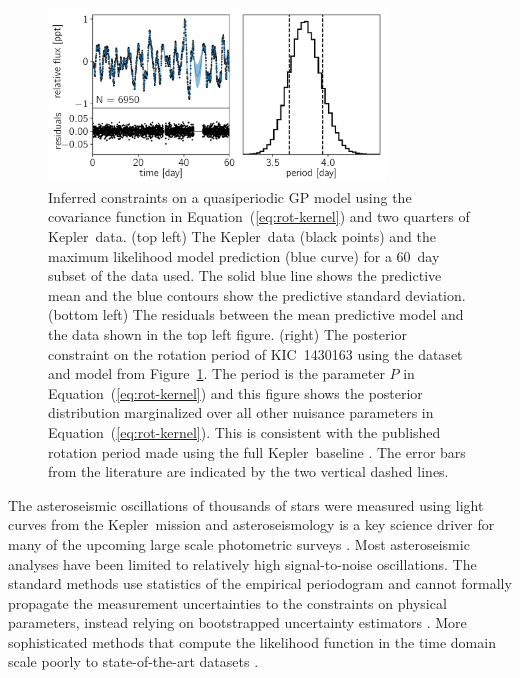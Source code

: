 \documentclass[manuscript, letterpaper]{aastex6}
\makeatletter
\let\origsubsection\subsection
\renewcommand\subsection{\@ifstar{\starsubsection}{\nostarsubsection}}
\newcommand\nostarsubsection[1]{\subsectionprelude\origsubsection{#1}}
\newcommand\starsubsection[1]{\subsectionprelude\origsubsection*{#1}}
\newcommand\subsectionprelude{\vspace{1em}}
\newcommand{\project}[1]{\textsf{#1}}
\newcommand{\kepler}{\project{Kepler}}
\newcommand{\figureref}[1]{\ref{fig:#1}}
\newcommand{\Figure}[1]{Figure~\figureref{#1}}
\newcommand{\figurelabel}[1]{\label{fig:#1}}
\renewcommand{\eqref}[1]{\ref{eq:#1}}
\newcommand{\Eq}[1]{Equation~(\eqref{#1})}
\newcommand{\eq}[1]{\Eq{#1}}
\makeatother
\begin{document}


\begin{figure}[p]
\begin{center}
\includegraphics[width=0.8\textwidth]{figures/rotation/rotation.pdf}
\caption{Inferred constraints on a quasiperiodic GP model using the covariance
    function in \eq{rot-kernel} and two quarters of \kepler\ data.
(top left) The \kepler\ data (black points) and the maximum likelihood model
    prediction (blue curve) for a 60~day subset of the data used.
    The solid blue line shows the predictive mean and the blue contours show
    the predictive standard deviation.
(bottom left) The residuals between the mean predictive model and the data
    shown in the top left figure.
(right) The posterior constraint on the rotation period of KIC~1430163 using
    the dataset and model from \Figure{rotation}.
    The period is the parameter $P$ in \eq{rot-kernel} and this figure shows
    the posterior distribution marginalized over all other nuisance parameters
    in \eq{rot-kernel}.
    This is consistent with the published rotation period made using the full
    \kepler\ baseline \citep{Mathur:2014}.
    The error bars from the literature are indicated by the two vertical
    dashed lines.
    \figurelabel{rotation}}
\end{center}
\end{figure}

\subsection{Asteroseismic oscillations}

The asteroseismic oscillations of thousands of stars were measured using light
curves from the \kepler\ mission \citep{Gilliland:2010, Huber:2011,
Chaplin:2011, Chaplin:2013, Stello:2013} and asteroseismology is a key science
driver for many of the upcoming large scale photometric surveys
\citep{Campante:2016, Rauer:2014, Gould:2015}.
Most asteroseismic analyses have been limited to relatively high
signal-to-noise oscillations.
The standard methods use statistics of the empirical periodogram and cannot
formally propagate the measurement uncertainties to the constraints on
physical parameters, instead relying on bootstrapped uncertainty estimators
\citep{Huber:2009}.
More sophisticated methods that compute the likelihood function in the time
domain scale poorly to state-of-the-art datasets \citep{Brewer:2009,
Corsaro:2014}.
\end{document}
